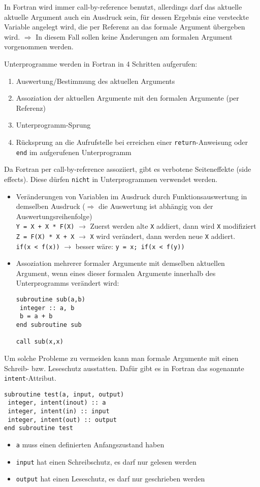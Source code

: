 In Fortran wird immer call-by-reference benutzt, allerdings darf das aktuelle aktuelle Argument auch ein Ausdruck sein, für dessen Ergebnis eine versteckte Variable angelegt wird, die per Referenz an das formale Argument übergeben wird. $\Rightarrow$ In diesem Fall sollen keine Änderungen am formalen Argument vorgenommen werden.

Unterprogramme werden in Fortran in 4 Schritten aufgerufen:
\begin{enumerate}
	\item Auswertung/Bestimmung des aktuellen Arguments
	\item Assoziation der aktuellen Argumente mit den formalen Argumente (per Referenz)
	\item Unterprogramm-Sprung
	\item Rücksprung an die Aufrufstelle bei erreichen einer \texttt{return}-Anweisung oder \texttt{end} im aufgerufenen Unterprogramm
\end{enumerate}

Da Fortran per call-by-reference assoziiert, gibt es verbotene Seiteneffekte (side effects). Diese dürfen \texttt{nicht} in Unterprogrammen verwendet werden.
\begin{itemize}
	\item Veränderungen von Variablen im Ausdruck durch Funktionsauswertung in demselben Ausdruck ($\Rightarrow$ die Auswertung ist abhängig von der Auswertungsreihenfolge) \\
	\texttt{Y = X + X * F(X)} $\to$ Zuerst werden alte \texttt{X} addiert, dann wird \texttt{X} modifiziert \\
	\texttt{Z = F(X) * X + X} $\to$ \texttt{X} wird verändert, dann werden neue \texttt{X} addiert. \\
	\texttt{if(x < f(x))} $\to$ besser wäre: \texttt{y = x; if(x < f(y))}
	\item Assoziation mehrerer formaler Argumente mit demselben aktuellen Argument, wenn eines dieser formalen Argumente innerhalb des Unterprogramms verändert wird:
	\begin{lstlisting}
subroutine sub(a,b)
 integer :: a, b
 b = a + b
end subroutine sub

call sub(x,x)
	\end{lstlisting}
\end{itemize}

Um solche Probleme zu vermeiden kann man formale Argumente mit einen Schreib- bzw. Leseschutz ausstatten. Dafür gibt es in Fortran das sogenannte \texttt{intent}-Attribut.
\begin{lstlisting}
subroutine test(a, input, output)
 integer, intent(inout) :: a
 integer, intent(in) :: input
 integer, intent(out) :: output
end subroutine test
\end{lstlisting}
\begin{itemize}
	\item \texttt{a} muss einen definierten Anfangszustand haben
	\item \texttt{input} hat einen Schreibschutz, es darf nur gelesen werden
	\item \texttt{output} hat einen Leseschutz, es darf nur geschrieben werden
\end{itemize}

